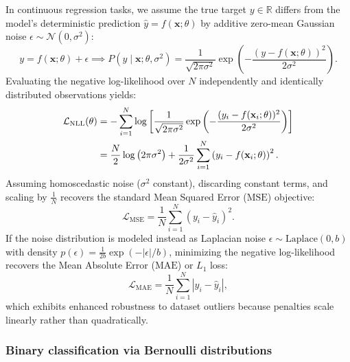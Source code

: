 \documentclass[../../../main.tex]{subfiles}
\begin{document}
In continuous regression tasks, we assume the true target $y \in \mathbb{R}$ differs from the model's deterministic prediction $\hat{y} = f(\mathbf{x}; \theta)$ by additive zero-mean Gaussian noise $\epsilon \sim \mathcal{N}(0, \sigma^2)$:
\begin{equation}
y = f(\mathbf{x}; \theta) + \epsilon \implies P(y \mid \mathbf{x}; \theta, \sigma^2) = \frac{1}{\sqrt{2\pi\sigma^2}} \exp\left( -\frac{(y - f(\mathbf{x}; \theta))^2}{2\sigma^2} \right).
\end{equation}
Evaluating the negative log-likelihood over $N$ independently and identically distributed observations yields:
\begin{align}
\mathcal{L}_{\text{NLL}}(\theta) &= -\sum_{i=1}^N \log \left[ \frac{1}{\sqrt{2\pi\sigma^2}} \exp\left( -\frac{(y_i - f(\mathbf{x}_i; \theta))^2}{2\sigma^2} \right) \right] \notag \\
&= \frac{N}{2} \log\left(2\pi\sigma^2\right) + \frac{1}{2\sigma^2} \sum_{i=1}^N \left( y_i - f(\mathbf{x}_i; \theta) \right)^2.
\end{align}
Assuming homoscedastic noise ($\sigma^2$ constant), discarding constant terms, and scaling by $\frac{1}{N}$ recovers the standard Mean Squared Error ($\text{MSE}$) objective:
\begin{equation}
\mathcal{L}_{\text{MSE}} = \frac{1}{N} \sum_{i=1}^N \left( y_i - \hat{y}_i \right)^2.
\end{equation}
If the noise distribution is modeled instead as Laplacian noise $\epsilon \sim \text{Laplace}(0, b)$ with density $p(\epsilon) = \frac{1}{2b}\exp(-|\epsilon|/b)$, minimizing the negative log-likelihood recovers the Mean Absolute Error ($\text{MAE}$) or $L_1$ loss:
\begin{equation}
\mathcal{L}_{\text{MAE}} = \frac{1}{N} \sum_{i=1}^N \left| y_i - \hat{y}_i \right|,
\end{equation}
which exhibits enhanced robustness to dataset outliers because penalties scale linearly rather than quadratically.

\subsubsection{Binary classification via Bernoulli distributions}
\end{document}
